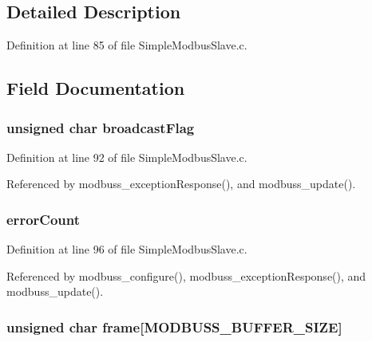 \subsection{Detailed Description}


Definition at line 85 of file Simple\-Modbus\-Slave.\-c.



\subsection{Field Documentation}
\hypertarget{struct_m_o_d_b_u_s_s___d_a_t_a_a81875e8eaabbfa2c8076e6115ef1202b}{
\subsubsection[{broadcast\-Flag}]{\setlength{\rightskip}{0pt plus 5cm}unsigned char broadcast\-Flag}}\label{struct_m_o_d_b_u_s_s___d_a_t_a_a81875e8eaabbfa2c8076e6115ef1202b}


Definition at line 92 of file Simple\-Modbus\-Slave.\-c.



Referenced by modbuss\-\_\-exception\-Response(), and modbuss\-\_\-update().

\hypertarget{struct_m_o_d_b_u_s_s___d_a_t_a_a948d8d10cfc452655af4092061d7ac97}{
\subsubsection[{error\-Count}]{ error\-Count}}\label{struct_m_o_d_b_u_s_s___d_a_t_a_a948d8d10cfc452655af4092061d7ac97}


Definition at line 96 of file Simple\-Modbus\-Slave.\-c.



Referenced by modbuss\-\_\-configure(), modbuss\-\_\-exception\-Response(), and modbuss\-\_\-update().

\hypertarget{struct_m_o_d_b_u_s_s___d_a_t_a_adde99c1f81da19926ec37aefb352105f}{
\subsubsection[{frame}]{\setlength{\rightskip}{0pt plus 5cm}unsigned char frame\mbox{[}{\bf M\-O\-D\-B\-U\-S\-S\-\_\-\-B\-U\-F\-F\-E\-R\-\_\-\-S\-I\-Z\-E}\mbox{]}}}\label{struct_m_o_d_b_u_s_s___d_a_t_a_adde99c1f81da19926ec37aefb352105f}


